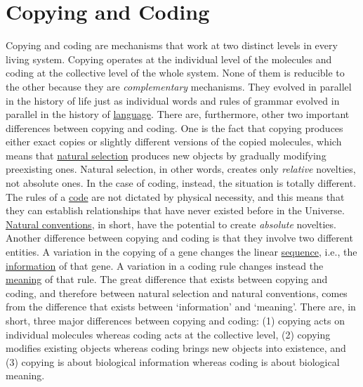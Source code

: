 \documentclass[12pt]{article}
\begin{document}
\section{Copying and Coding}
Copying and coding are mechanisms that work at two distinct levels in every living system. Copying operates at the individual level of the molecules and coding at the collective level of the whole system. None of them is reducible to the other because they are \textit{complementary} mechanisms. They evolved in parallel in the history of life just as individual words and rules of grammar evolved in parallel in the history of \hyperlink{language}{language}. There are, furthermore, other two important differences between copying and coding. One is the fact that copying produces either exact copies or slightly different versions of the copied molecules, which means that \hyperlink{natural_selection}{natural selection} produces new objects by gradually modifying preexisting ones. Natural selection, in other words, creates only \textit{relative} novelties, not absolute ones. In the case of coding, instead, the situation is totally different. The rules of a \hyperlink{code}{code} are not dictated by physical necessity, and this means that they can establish relationships that have never existed before in the Universe. \hyperlink{natural_conventions}{Natural conventions}, in short, have the potential to create \textit{absolute} novelties. Another difference between copying and coding is that they involve two different entities. A variation in the copying of a gene changes the linear \hyperlink{sequences}{sequence}, i.e., the \hyperlink{organic_information}{information} of that gene. A variation in a coding rule changes instead the \hyperlink{meaning}{meaning} of that rule. The great difference that exists between copying and coding, and therefore between natural selection and natural conventions, comes from the difference that exists between `information' and `meaning'. There are, in short, three major differences between copying and coding: (1) copying acts on individual molecules whereas coding acts at the collective level, (2) copying modifies existing objects whereas coding brings new objects into existence, and (3) copying is about biological information whereas coding is about biological meaning. 


\hypertarget{copying_semiosis}{}
\end{document}
